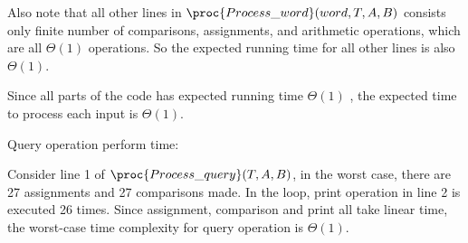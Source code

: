 \documentclass[11pt, answers]{exam}
\theoremstyle{plain}
\theoremstyle{definition}
\begin{document}
\begin{questions}
\begin{solution}
\begin{enumerate}
Also note that all other lines in $\proc{Process\_word}(word, T, A, B)$ consists only finite number of comparisons, assignments, and arithmetic operations, which are all $\Theta{(1)}$ operations. So the expected running time for all other lines is also $\Theta{(1)}$.

Since all parts of the code has expected running time $\Theta{(1)}$ , the expected time to process each input is $\Theta{(1)}$.

Query operation perform time:

Consider line 1 of $\proc{Process\_query}(T, A, B)$, in the worst case, there are 27 assignments and 27 comparisons made. In the loop, print operation in line 2 is executed 26 times. Since assignment, comparison and print all take linear time, the worst-case time complexity for query operation is $\Theta{(1)}$.
\end{enumerate}
\end{solution}

\end{questions}
\end{document}
